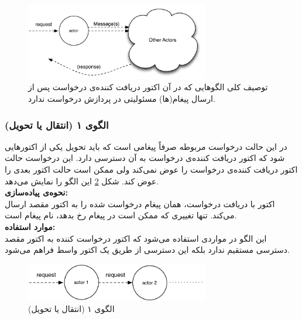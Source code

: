 \begin{figure}[hb]
    \begin{center}
	\includegraphics[width=8cm]{4-ProposedFramework/Figures/Patterns_stateless.pdf}
    \end{center}
    \caption{\label{fig:Patterns_stateless}توصیف کلی الگوهایی که در آن اکتور دریافت کننده‌ی درخواست پس از ارسال پیغام(ها) مسئولیتی در پردازش درخواست ندارد.}
\end{figure}

\subsubsection{الگوی ۱ (انتقال یا تحویل)}
در این حالت درخواست مربوطه صرفاً پیغامی‌ است که باید تحویل یکی از اکتورهایی شود که اکتور دریافت کننده‌ی درخواست به آن دسترسی دارد. این درخواست حالت اکتور دریافت کننده‌ی درخواست را عوض نمی‌کند ولی ممکن است حالت اکتور بعدی را عوض کند. شکل \ref{fig:Patterns_stateless_forward} این الگو را نمایش می‌دهد.\\

\textbf{نحوه‌ی پیاده‌سازی:}\\
اکتور با دریافت درخواست،‌ همان پیغام درخواست شده را به اکتور مقصد ارسال می‌کند. تنها تغییری که ممکن است در پیغام رخ بدهد، نام پیغام است.\\
\textbf{موارد استفاده:}\\
این الگو در مواردی استفاده می‌شود که اکتور درخواست کننده به اکتور مقصد دسترسی مستقیم ندارد بلکه این دسترسی از طریق یک اکتور واسط فراهم می‌شود.

\begin{figure}[hb]
    \begin{center}
	\includegraphics[width=8cm]{4-ProposedFramework/Figures/Patterns_stateless_forward.pdf}
    \end{center}
    \caption{\label{fig:Patterns_stateless_forward}الگوی ۱ (انتقال یا تحویل)}
\end{figure}

